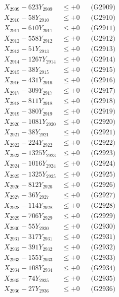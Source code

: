 \documentclass[a4paper,10pt]{article}
\begin{document}
{\begin{align}
X_{2909} - 623Y_{2909} &\leq +0 && \text{(G2909)} \\
X_{2910} - 58Y_{2910} &\leq +0 && \text{(G2910)} \\
\allowbreak
X_{2911} - 610Y_{2911} &\leq +0 && \text{(G2911)} \\
X_{2912} - 558Y_{2912} &\leq +0 && \text{(G2912)} \\
X_{2913} - 51Y_{2913} &\leq +0 && \text{(G2913)} \\
X_{2914} - 1267Y_{2914} &\leq +0 && \text{(G2914)} \\
X_{2915} - 38Y_{2915} &\leq +0 && \text{(G2915)} \\
X_{2916} - 431Y_{2916} &\leq +0 && \text{(G2916)} \\
X_{2917} - 309Y_{2917} &\leq +0 && \text{(G2917)} \\
X_{2918} - 811Y_{2918} &\leq +0 && \text{(G2918)} \\
X_{2919} - 380Y_{2919} &\leq +0 && \text{(G2919)} \\
X_{2920} - 1081Y_{2920} &\leq +0 && \text{(G2920)} \\
\allowbreak
X_{2921} - 38Y_{2921} &\leq +0 && \text{(G2921)} \\
X_{2922} - 224Y_{2922} &\leq +0 && \text{(G2922)} \\
X_{2923} - 1325Y_{2923} &\leq +0 && \text{(G2923)} \\
X_{2924} - 1016Y_{2924} &\leq +0 && \text{(G2924)} \\
X_{2925} - 1325Y_{2925} &\leq +0 && \text{(G2925)} \\
X_{2926} - 812Y_{2926} &\leq +0 && \text{(G2926)} \\
X_{2927} - 36Y_{2927} &\leq +0 && \text{(G2927)} \\
X_{2928} - 114Y_{2928} &\leq +0 && \text{(G2928)} \\
X_{2929} - 706Y_{2929} &\leq +0 && \text{(G2929)} \\
X_{2930} - 55Y_{2930} &\leq +0 && \text{(G2930)} \\
\allowbreak
X_{2931} - 317Y_{2931} &\leq +0 && \text{(G2931)} \\
X_{2932} - 391Y_{2932} &\leq +0 && \text{(G2932)} \\
X_{2933} - 155Y_{2933} &\leq +0 && \text{(G2933)} \\
X_{2934} - 108Y_{2934} &\leq +0 && \text{(G2934)} \\
X_{2935} - 74Y_{2935} &\leq +0 && \text{(G2935)} \\
X_{2936} - 27Y_{2936} &\leq +0 && \text{(G2936)} \\

\end{align}}
\end{document}
